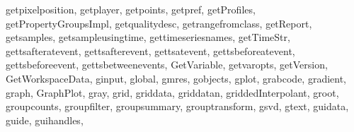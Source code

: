 {{        getpixelposition,%
        getplayer,%
        getpoints,%
        getpref,%
        getProfiles,%
        getPropertyGroupsImpl,%
        getqualitydesc,%
        getrangefromclass,%
        getReport,%
        getsamples,%
        getsampleusingtime,%
        gettimeseriesnames,%
        getTimeStr,%
        gettsafteratevent,%
        gettsafterevent,%
        gettsatevent,%
        gettsbeforeatevent,%
        gettsbeforeevent,%
        gettsbetweenevents,%
        GetVariable,%
        getvaropts,%
        getVersion,%
        GetWorkspaceData,%
        ginput,%
        global,%
        gmres,%
        gobjects,%
        gplot,%
        grabcode,%
        gradient,%
        graph,%
        GraphPlot,%
        gray,%
        grid,%
        griddata,%
        griddatan,%
        griddedInterpolant,%
        groot,%
        groupcounts,%
        groupfilter,%
        groupsummary,%
        grouptransform,%
        gsvd,%
        gtext,%
        guidata,%
        guide,%
        guihandles,%
}}
